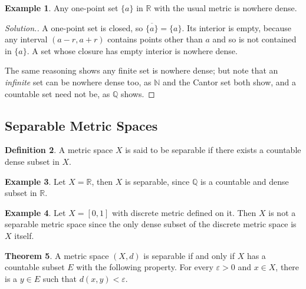 \documentclass[11pt,a4paper]{article}
\theoremstyle{definition}
\newtheorem{thm}{Theorem}[section]
\newtheorem{defn}[thm]{Definition}
\newtheorem{exa}[thm]{Example}
\newenvironment{solution}
  {\renewcommand{\qedsymbol}{}\begin{proof}[\textit{Solution}.]}
  {\end{proof}}
\begin{document}
\begin{exa}
Any one-point set $\{a\}$ in $\mathbb{R}$ with the usual metric is nowhere dense.
\end{exa}

\begin{solution}
A one-point set is closed, so $\overline{\{a\}}=\{a\}$. Its interior is empty, because any interval $(a-r,a+r)$ contains points other than $a$ and so is not contained in $\{a\}$. A set whose closure has empty interior is nowhere dense.

The same reasoning shows any finite set is nowhere dense; but note that an \emph{infinite} set can be nowhere dense too, as $\mathbb{N}$ and the Cantor set both show, and a countable set need not be, as $\mathbb{Q}$ shows.
\end{solution}

\subsection{Separable Metric Spaces}

\begin{defn}
A metric space $X$ is said to be separable if there exists a countable dense subset in $X$.

\end{defn}


\begin{exa}
Let $X=\mathbb{R}$, then $X$ is separable, since $\mathbb{Q}$ is a countable and dense subset in $\mathbb{R}$.

\end{exa}


\begin{exa}
Let $X=[0,1]$ with discrete metric defined on it. Then $X$ is not a separable metric space since the only dense subset of the discrete metric space is $X$ itself.

\end{exa}


\begin{thm}
A metric space $(X,d)$ is separable if and only if $X$ has a countable subset $E$ with the following property. For every $\varepsilon>0$ and $x\in X$, there is a $y\in E$ such that $d(x,y)<\varepsilon$.

\end{thm}
\end{document}
